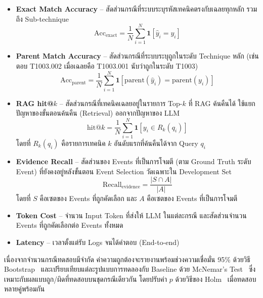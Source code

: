 \begin{itemize}
  \item \textbf{Exact Match Accuracy} -- สัดส่วนกรณีที่ระบบระบุรหัสเทคนิคตรงกับเฉลยทุกหลัก
        รวมถึง Sub-technique
        \begin{equation}
        \mathrm{Acc}_{\mathrm{exact}} = \frac{1}{N}\sum_{i=1}^{N} \mathbf{1}\left[\hat{y}_i = y_i\right]
        \end{equation}

  \item \textbf{Parent Match Accuracy} -- สัดส่วนกรณีที่ระบบระบุถูกในระดับ Technique หลัก
        (เช่น ตอบ T1003.002 เมื่อเฉลยคือ T1003.001 นับว่าถูกในระดับ T1003)
        \begin{equation}
        \mathrm{Acc}_{\mathrm{parent}} = \frac{1}{N}\sum_{i=1}^{N} \mathbf{1}\left[\mathrm{parent}(\hat{y}_i) = \mathrm{parent}(y_i)\right]
        \end{equation}

  \item \textbf{RAG hit@$k$} -- สัดส่วนกรณีที่เทคนิคเฉลยอยู่ในรายการ Top-$k$ ที่ RAG ค้นคืนได้
        ใช้แยกปัญหาของขั้นตอนค้นคืน (Retrieval) ออกจากปัญหาของ LLM
        \begin{equation}
        \mathrm{hit@}k = \frac{1}{N}\sum_{i=1}^{N} \mathbf{1}\left[y_i \in R_k(q_i)\right]
        \end{equation}
        โดยที่ $R_k(q_i)$ คือรายการเทคนิค $k$ อันดับแรกที่ค้นคืนได้จาก Query $q_i$

  \item \textbf{Evidence Recall} -- สัดส่วนของ Events ที่เป็นการโจมตี (ตาม Ground Truth ระดับ Event)
        ที่ยังคงอยู่หลังขั้นตอน Event Selection วัดเฉพาะใน Development Set
        \begin{equation}
        \mathrm{Recall}_{\mathrm{evidence}} = \frac{|S \cap A|}{|A|}
        \end{equation}
        โดยที่ $S$ คือเซตของ Events ที่ถูกคัดเลือก และ $A$ คือเซตของ Events ที่เป็นการโจมตี

  \item \textbf{Token Cost} -- จำนวน Input Token ที่ส่งให้ LLM ในแต่ละกรณี
        และสัดส่วนจำนวน Events ที่ถูกคัดเลือกต่อ Events ทั้งหมด

  \item \textbf{Latency} -- เวลาตั้งแต่รับ Logs จนได้คำตอบ (End-to-end)
\end{itemize}

เนื่องจากจำนวนกรณีทดสอบมีจำกัด ค่าความถูกต้องจะรายงานพร้อมช่วงความเชื่อมั่น 95\%
ด้วยวิธี Bootstrap~\cite{efron1979} และเปรียบเทียบแต่ละรูปแบบการทดลองกับ Baseline
ด้วย McNemar's Test~\cite{mcnemar1947} ซึ่งเหมาะกับผลแบบถูก/ผิดที่ทดสอบบนชุดกรณีเดียวกัน
โดยปรับค่า $p$ ด้วยวิธีของ Holm~\cite{holm1979} เมื่อทดสอบหลายคู่พร้อมกัน

